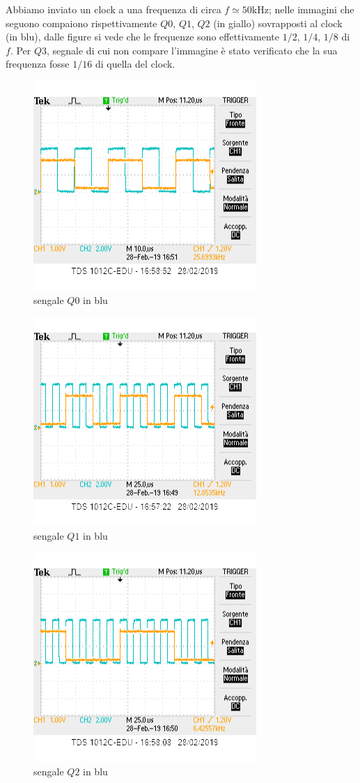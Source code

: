 \documentclass[10pt,a4paper]{article}
\begin{document}
Abbiamo inviato un clock a una frequenza di circa $f\simeq 50 \si{\kilo \hertz}$; nelle immagini che seguono compaiono  rispettivamente $Q0$, $Q1$, $Q2$  (in giallo) sovrapposti al clock (in blu), dalle figure si vede che le frequenze sono effettivamente $1/2$, $1/4$, $1/8$ di $f$. Per $Q3$, segnale di cui non compare l'immagine è stato verificato che la sua frequenza fosse $1/16$ di quella del clock.
\begin{figure}[h]
			\centering
			\includegraphics[scale=0.85]{1mezzo}
			\caption{sengale $Q0$ in blu}
			\label{fig:plh}
\end{figure}
\begin{figure}[h]
			\centering
			\includegraphics[scale=0.85]{1quarto}
			\caption{sengale $Q1$ in blu}
			\label{fig:plh}
\end{figure}
\begin{figure}[h]
			\centering
			\includegraphics[scale=0.85]{1ottavo}
			\caption{sengale $Q2$ in blu}
			\label{fig:plh}
\end{figure}
\end{document}
